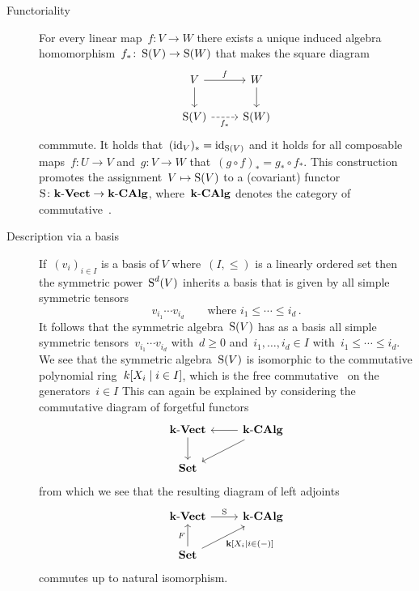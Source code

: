 \begin{recall}
\begin{description}
    \item[Functoriality]
      For every linear map~$f \colon V \to W$ there exists a unique induced algebra homomorphism~$f_* \colon \operatorname{S}(V) \to \operatorname{S}(W)$ that makes the square diagram
      \[
        \begin{tikzcd}
          V
          \arrow{r}[above]{f}
          \arrow{d}
          &
          W
          \arrow{d}
          \\
          \Symm(V)
          \arrow[dashed]{r}[below]{f_*}
          &
          \Symm(W)
        \end{tikzcd}
      \]
      commmute.
      It holds that~$(\operatorname{id}_V)_* = \operatorname{id}_{\operatorname{S}(V)}$ and it holds for all composable~{\linear{$\kf$}} maps~$f \colon U \to V$ and~$g \colon V \to W$ that~$(g \circ f)_* = g_* \circ f_*$.
      This construction promotes the assignment~$V \mapsto \operatorname{S}(V)$ to a (covariant) functor~$\operatorname{S} \colon \mathbf{k}\text{-}\mathbf{Vect} \to \mathbf{k}\text{-}\mathbf{CAlg}$, where~$\mathbf{k}\text{-}\mathbf{CAlg}$ denotes the category of commutative~{\algebras{$\kf$}}.
      
    \item[Description via a basis]
      If~$(v_i)_{i \in I}$ is a basis of$~V$ where~$(I, \leq)$ is a linearly ordered set then the symmetric power~$\operatorname{S}^d(V)$ inherits a basis that is given by all simple symmetric tensors
      \[
        v_{i_1} \dotsm v_{i_d}
        \qquad
        \text{where~$i_1 \leq \dotsb \leq i_d$} \,.
      \]
      It follows that the symmetric algebra~$\operatorname{S}(V)$ has as a basis all simple symmetric tensors~$v_{i_1} \dotsm v_{i_d}$ with~$d \geq 0$ and~$i_1, \dotsc, i_d \in I$ with~$i_1 \leq \dotsb \leq i_d$.
      We see that the symmetric algebra~$\operatorname{S}(V)$ is isomorphic to the commutative polynomial ring~$k[X_i \suchthat i \in I]$, which is the free commutative~{\algebra{$\kf$}} on the generators~$i \in I$
      This can again be explained by considering the commutative diagram of forgetful functors
      \[
        \begin{tikzcd}
          \cVect{\kf}
          \arrow{d}
          &
          \cCAlg{\kf}
          \arrow{l}
          \arrow{dl}
          \\
          \cSet
          &
          {}
        \end{tikzcd}
      \]
      from which we see that the resulting diagram of left adjoints
      \[
        \begin{tikzcd}
          \cVect{\kf}
          \arrow{r}[above]{\Symm}
          &
          \cCAlg{\kf}
          \\
          \cSet
          \arrow{u}[left]{F}
          \arrow{ur}[below right]{\kf[X_i \suchthat i \in (-)]}
          &
          {}
        \end{tikzcd}
      \]
      commutes up to natural isomorphism.
      

\end{description}
\end{recall}
